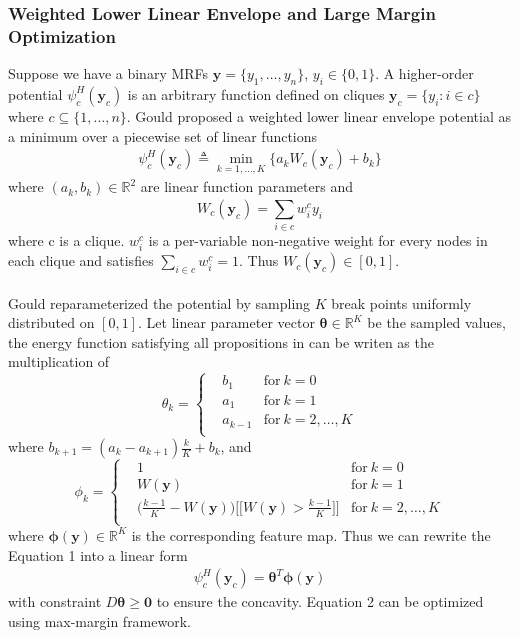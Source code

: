 \documentclass{article}
\begin{document}
		\subsubsection{Weighted Lower Linear Envelope and Large Margin Optimization}
		Suppose we have a binary MRFs $\mathbf{y}=\{y_1,\dots,y_n\}$, $y_i\in\{0,1\}$. A higher-order potential $\psi_c^H(\mathbf{y}_c)$ is an arbitrary function defined on cliques $\mathbf{y}_c=\{y_i : i\in c\}$ where $c\subseteq\{1,\dots,n\}$. Gould\cite{gouldlearning} proposed a weighted lower linear envelope potential as a minimum over a piecewise set of linear functions
		\begin{align}
		\psi_c^H(\mathbf{y}_c) \triangleq \min_{k=1,\dots,K}\bigg\{a_kW_c(\mathbf{y}_c)+b_k\bigg\}
		\end{align}
		where $(a_k,b_k)\in\mathbb{R}^2$ are linear function parameters and
		$$
		W_c(\mathbf{y}_c) = \sum_{i\in c}^{}w_i^cy_i
		$$
		where c is a clique. $w_i^c$ is a per-variable non-negative weight for every nodes in each clique and satisfies $\sum_ {i\in c}^{}w_i^c=1$. Thus $W_c(\mathbf{y}_c) \in [0,1]$.\\\\
		Gould\cite{gouldlearning} reparameterized the potential by sampling $K$ break points uniformly distributed on $[0,1]$. Let linear parameter vector $\boldsymbol{\theta}\in\mathbb{R}^K$ be the sampled values, the energy function satisfying all propositions in \cite{gouldlearning} can be writen as the multiplication of
		\begin{equation*}
		\theta_k = \left\{
		\begin{aligned}
		& b_1	& \text{for} \ k=0\\
		& a_1 & \text{for}\ k=1\\
		& a_{k-1}  & \text{for} \ k=2,\dots,K\\
		\end{aligned}
		\right.
		\end{equation*}
		where $b_{k+1}=(a_k-a_{k+1})\frac{k}{K}+b_k$, and
		\begin{equation*}
		\phi_k = \left\{
		\begin{aligned}
		& 1	& \text{for} \ k=0\\
		& W(\mathbf{y}) & \text{for}\ k=1\\
		& \bigg(\frac{k-1}{K}-W(\mathbf{y}) \bigg)\bigg[\bigg[ W(\mathbf{y}) > \frac{k-1}{K}\bigg]\bigg]  & \text{for} \ k=2,\dots,K\\
		\end{aligned}
		\right.
		\end{equation*}
		where $\boldsymbol{\phi}(\mathbf{y})\in \mathbb{R}^K$ is the corresponding feature map. Thus we can rewrite the Equation 1 into a linear form
		\begin{align}
		\psi_c^H(\mathbf{y}_c)=\boldsymbol{\theta}^T\boldsymbol{\phi}(\mathbf{y})
		\end{align}
		with constraint $ D\boldsymbol{\theta}\geq \mathbf{0}$ to ensure the concavity. Equation 2 can be optimized using max-margin framework.
		
\end{document}
